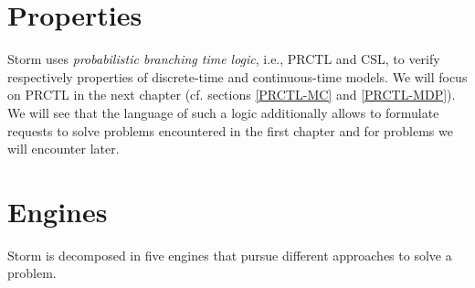 \section{Properties}
Storm uses \textit{probabilistic branching time logic}, i.e., PRCTL and CSL,
to verify respectively properties of discrete-time and continuous-time models.
We will focus on PRCTL in the next chapter (cf. sections \ref{PRCTL-MC} and \ref{PRCTL-MDP}).
We will see that the language of such a logic additionally allows to formulate requests to solve problems encountered in the first chapter and for problems we will encounter later.

\section{Engines}
Storm is decomposed in five engines that pursue different approaches to solve a problem.
